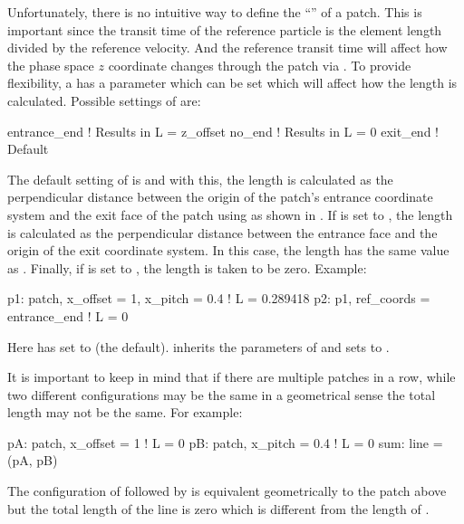 {Unfortunately, there is no intuitive way to define the ``''  of a patch. This is
important since the transit time of the reference particle is the element length divided by the
reference velocity. And the reference transit time will affect how the phase space $z$ coordinate
changes through the patch via . To provide flexibility, a  has a 
parameter which can be set which will affect how the length is calculated. Possible settings of
 are:
\begin{example}
  entrance_end  ! Results in L = z_offset
  no_end        ! Results in L = 0
  exit_end      ! Default
\end{example}
The default setting of  is  and with this, the length is calculated as
the perpendicular distance between the origin of the patch's entrance coordinate system and the exit
face of the patch using as shown in . If  is set to ,
the length is calculated as the perpendicular distance between the entrance face and the origin of
the exit coordinate system. In this case, the length has the same value as . Finally,
if  is set to , the length is taken to be zero. Example:
\begin{example}
  p1: patch, x_offset = 1, x_pitch = 0.4   ! L = 0.289418
  p2: p1, ref_coords = entrance_end        ! L = 0
\end{example}
Here  has  set to  (the default).  inherits the parameters
of  and sets  to .

It is important to keep in mind that if there are multiple patches in a row, while two different
configurations may be the same in a geometrical sense the total length may not be the same. For
example:
\begin{example}
  pA: patch, x_offset = 1    ! L = 0
  pB: patch, x_pitch = 0.4   ! L = 0
  sum: line = (pA, pB)
\end{example}
The configuration of  followed by  is equivalent geometrically to the  patch
above but the total length of the  line is zero which is different from the length of
.

}
